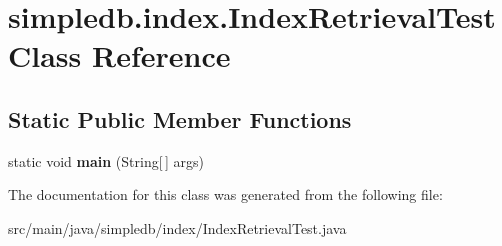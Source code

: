 \hypertarget{classsimpledb_1_1index_1_1IndexRetrievalTest}{}\section{simpledb.\+index.\+Index\+Retrieval\+Test Class Reference}
\label{classsimpledb_1_1index_1_1IndexRetrievalTest}
\subsection*{Static Public Member Functions}
\begin{DoxyCompactItemize}
\item 
\mbox{\label{classsimpledb_1_1index_1_1IndexRetrievalTest_a1ddd1fa4821e62955280615fc3e2c942}} 
static void {\bfseries main} (String\mbox{[}$\,$\mbox{]} args)
\end{DoxyCompactItemize}


The documentation for this class was generated from the following file\+:\begin{DoxyCompactItemize}
\item 
src/main/java/simpledb/index/Index\+Retrieval\+Test.\+java\end{DoxyCompactItemize}
